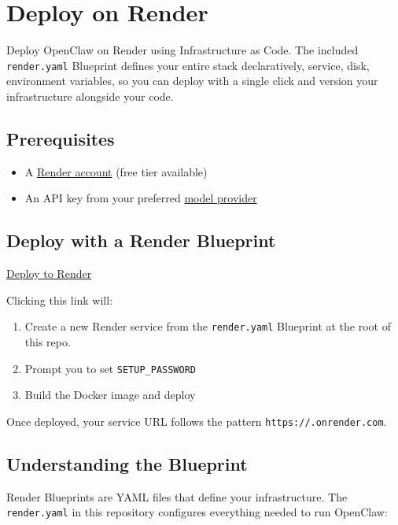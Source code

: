 \section{Deploy on Render}

Deploy OpenClaw on Render using Infrastructure as Code. The included \texttt{render.yaml} Blueprint defines your entire stack declaratively, service, disk, environment variables, so you can deploy with a single click and version your infrastructure alongside your code.

\subsection{Prerequisites}


\begin{itemize}
  \item A \href{https://render.com}{Render account} (free tier available)
  \item An API key from your preferred \href{/providers}{model provider}
\end{itemize}


\subsection{Deploy with a Render Blueprint}


\href{https://render.com/deploy?repo=https://github.com/openclaw/openclaw}{Deploy to Render}

Clicking this link will:

\begin{enumerate}
  \item Create a new Render service from the \texttt{render.yaml} Blueprint at the root of this repo.
  \item Prompt you to set \texttt{SETUP\_PASSWORD}
  \item Build the Docker image and deploy
\end{enumerate}


Once deployed, your service URL follows the pattern \texttt{https://.onrender.com}.

\subsection{Understanding the Blueprint}


Render Blueprints are YAML files that define your infrastructure. The \texttt{render.yaml} in this
repository configures everything needed to run OpenClaw:

